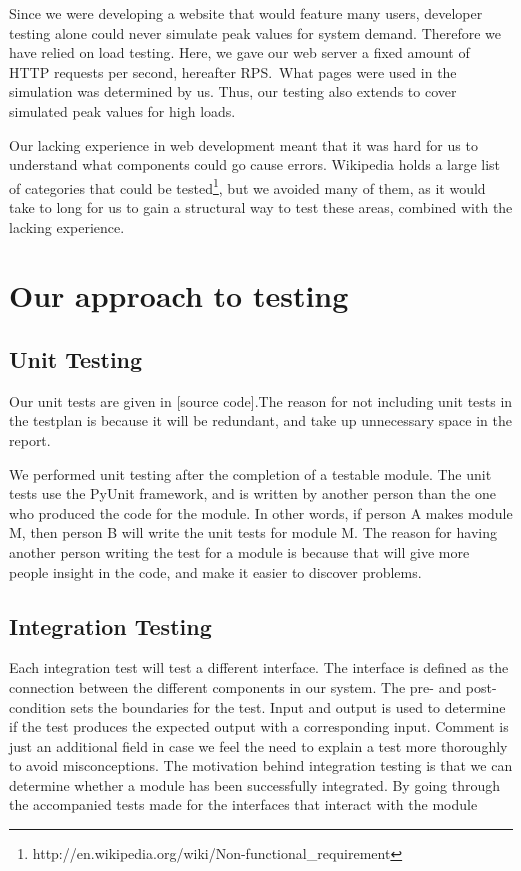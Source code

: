 Since we were developing a website that would feature many users, developer
testing alone could never simulate peak values for system demand. Therefore we
have relied on load testing. Here, we gave our web server a fixed amount of
HTTP requests per second, hereafter RPS.\ What pages were used in the
simulation was determined by us. Thus, our testing also extends to cover
simulated peak values for high loads.


Our lacking experience in web development meant that it was hard for us to
understand what components could go cause errors. Wikipedia holds a large list
of categories that could be
tested\footnote{http://en.wikipedia.org/wiki/Non-functional\_requirement}, but
we avoided many of them, as it would take to long for us to gain a structural
way to test these areas, combined with the lacking experience. 

\section{Our approach to testing}
\subsection{Unit Testing}
Our unit tests are given in [source code].The reason for not including unit
tests in the testplan is because it will be redundant, and take up unnecessary
space in the report.

We performed unit testing after the completion of a testable module. The unit
tests use the PyUnit framework, and is written by another person than the one
who produced the code for the module. In other words, if person A makes module
M, then person B will write the unit tests for module M. The reason for having
another person writing the test for a module is because that will give more
people insight in the code, and make it easier to discover problems.

\subsection{Integration Testing} Each integration test will test a different
interface. The interface is defined as the connection between the different
components in our system. The pre- and post-condition sets the boundaries for
the test.  Input and output is used to determine if the test produces the
expected output with a corresponding input. Comment is just an additional field
in case we feel the need to explain a test more thoroughly to avoid
misconceptions. The motivation behind integration testing is that we can
determine whether a module has been successfully integrated. By going through
the accompanied tests made for the interfaces that interact with the module


